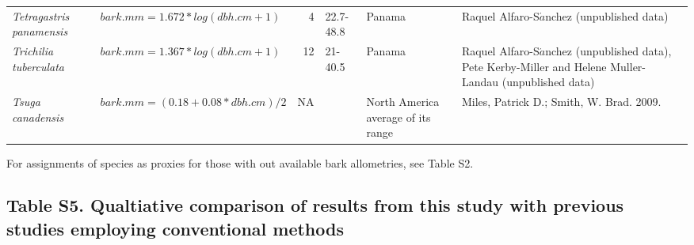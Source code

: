 \documentclass[
]{article}
\begin{document}
\begin{table}[!h]
{\begin{tabular}{>{}llrl>{\raggedright\arraybackslash}p{3cm}>{\raggedright\arraybackslash}p{6cm}}
\addlinespace
\em{Tetragastris panamensis} & $bark.mm = 1.672 * log(dbh.cm + 1)$ & 4 & 22.7-48.8 & Panama & Raquel Alfaro-S$\acute{a}$nchez (unpublished data)\\
\addlinespace
\em{Trichilia tuberculata} & $bark.mm = 1.367 * log(dbh.cm + 1)$ & 12 & 21-40.5 & Panama & Raquel Alfaro-S$\acute{a}$nchez (unpublished data), Pete Kerby-Miller and Helene Muller-Landau (unpublished data)\\
\addlinespace
\em{Tsuga canadensis} & $bark.mm = (0.18 + 0.08 * dbh.cm)/2$ & NA &  & North America average of its range & Miles, Patrick D.; Smith, W. Brad. 2009.\\
\bottomrule
\end{tabular}}
\end{table}

For assignments of species as proxies for those with out available bark
allometries, see Table S2.

\newpage

\hypertarget{table-s5.-qualtiative-comparison-of-results-from-this-study-with-previous-studies-employing-conventional-methods}{%
\subsection{Table S5. Qualtiative comparison of results from this study
with previous studies employing conventional
methods}\label{table-s5.-qualtiative-comparison-of-results-from-this-study-with-previous-studies-employing-conventional-methods}}

\begingroup\fontsize{7}{9}\selectfont
\end{document}
